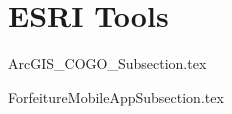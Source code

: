 \documentclass[class=book , crop=false]{standalone}
\title{}  %
\begin{document}
\ifstandalone
\maketitle %
\clearpage
\tableofcontents %
\fi



\section{ESRI Tools}

{ArcGIS_COGO_Subsection.tex}

{ForfeitureMobileAppSubsection.tex}
\end{document}
